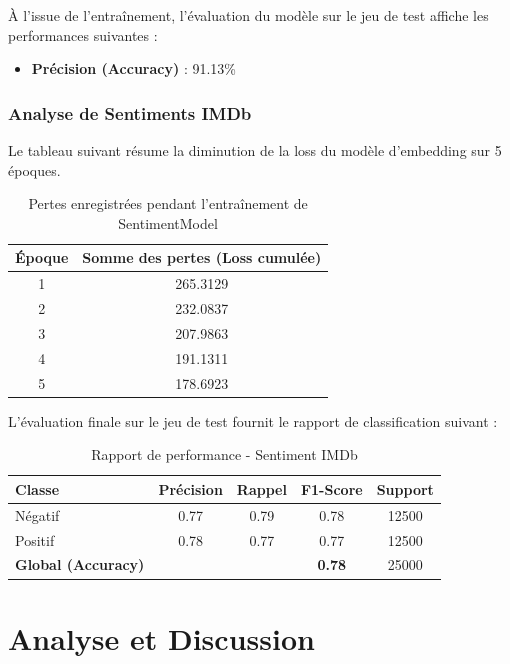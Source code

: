 \documentclass[12pt,a4paper,oneside]{report}
\begin{document}
À l'issue de l'entraînement, l'évaluation du modèle sur le jeu de test affiche les performances suivantes :
\begin{itemize}
    \item \textbf{Précision (Accuracy)} : 91.13\%
\end{itemize}

\subsection{Analyse de Sentiments IMDb}
Le tableau suivant résume la diminution de la loss du modèle d'embedding sur 5 époques.
\begin{table}[H]
    \centering
    \caption{Pertes enregistrées pendant l'entraînement de SentimentModel}
    \begin{tabular}{cc}
        \toprule
        Époque & Somme des pertes (Loss cumulée) \\
        \midrule
        1 & 265.3129 \\
        2 & 232.0837 \\
        3 & 207.9863 \\
        4 & 191.1311 \\
        5 & 178.6923 \\
        \bottomrule
    \end{tabular}
    \label{tab:loss_sentiment}
\end{table}

L'évaluation finale sur le jeu de test fournit le rapport de classification suivant :
\begin{table}[H]
    \centering
    \caption{Rapport de performance - Sentiment IMDb}
    \begin{tabular}{lcccc}
        \toprule
        Classe & Précision & Rappel & F1-Score & Support \\
        \midrule
        Négatif & 0.77 & 0.79 & 0.78 & 12500 \\
        Positif & 0.78 & 0.77 & 0.77 & 12500 \\
        \midrule
        \textbf{Global (Accuracy)} & & & \textbf{0.78} & 25000 \\
        \bottomrule
    \end{tabular}
    \label{tab:report_sentiment}
\end{table}

\chapter{Analyse et Discussion}
\end{document}
